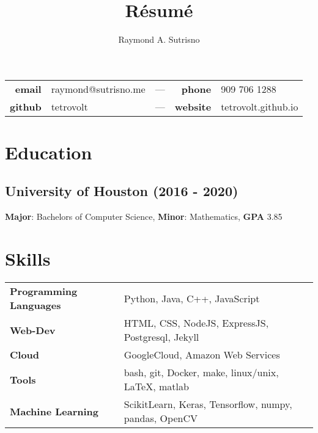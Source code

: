 \documentclass{article}
\title{R\'esum\'e}
\author{Raymond A. Sutrisno}
\date{}
\makeatletter
\renewcommand{\maketitle}{
\begin{center}
{\Large\bfseries\theauthor}
\begin{center}
\begin{tabular}{ r l c r l }
 \textbf{email} & raymond@sutrisno.me & --- & \textbf{phone} & 909 706 1288 \\
 \textbf{github} & tetrovolt & --- & \textbf{website} & tetrovolt.github.io
\end{tabular}
\end{center}
\end{center}
}
\makeatother
\begin{document}
\maketitle

\section{Education}
\subsection{University of Houston (2016 - 2020)}
\textbf{Major}: Bachelors of Computer Science,
\textbf{Minor}: Mathematics,
\textbf{GPA} {3.85}

\section{Skills}
\begin{tabular}{p{5cm} l}
    \textbf{Programming Languages} & Python, Java, C++, JavaScript  \\
    \textbf{Web-Dev} & HTML, CSS, NodeJS, ExpressJS, Postgresql, Jekyll \\
    \textbf{Cloud} & GoogleCloud, Amazon Web Services \\
    \textbf{Tools} & bash, git, Docker, make, linux/unix, \LaTeX, matlab \\
    \textbf{Machine Learning} & ScikitLearn, Keras, Tensorflow, numpy, pandas, OpenCV
\end{tabular}
\end{document}
